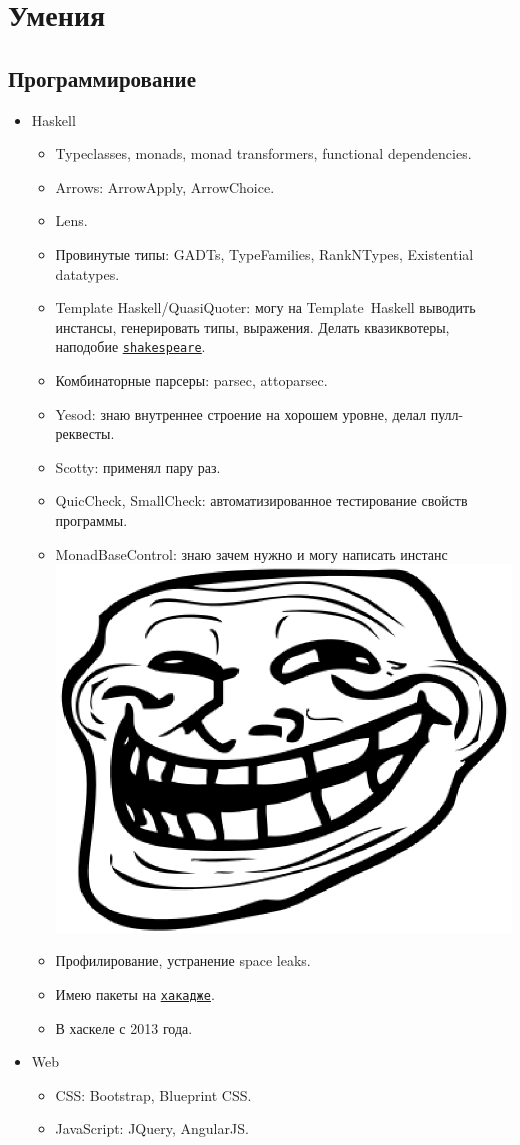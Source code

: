 \documentclass[11pt,a4paper,sans]{moderncv}
\newcommand*{\nlink}[2]{\textcolor{blue}{\texttt{\underline{\href{#1}{#2}}}}}
\begin{document}
\section{Умения}

\subsection{Программирование}

\begin{itemize}
\item Haskell
  \begin{itemize}
  \item Typeclasses, monads, monad transformers, functional dependencies.
  \item Arrows: ArrowApply, ArrowChoice.
  \item Lens.
  \item Провинутые типы: GADTs, TypeFamilies, RankNTypes, Existential datatypes.
  \item Template Haskell/QuasiQuoter: могу на \hbox{Template Haskell}
    выводить инстансы, генерировать типы, выражения. Делать
    квазиквотеры, наподобие
    \nlink{http://hackage.haskell.org/package/shakespeare}{shakespeare}.
  \item Комбинаторные парсеры: parsec, attoparsec.
  \item Yesod: знаю внутреннее строение на хорошем уровне, делал пулл-реквесты.
  \item Scotty: применял пару раз.
  \item QuicCheck, SmallCheck: автоматизированное тестирование свойств
    программы.
  \item MonadBaseControl: знаю зачем нужно и могу написать инстанс
    \includegraphics[height=0.9ex]{Trollface.ps}
  \item Профилирование, устранение space leaks.
  \item Имею пакеты на
    \nlink{http://hackage.haskell.org/user/AlekseyUymanov}{хакадже}.
  \item В хаскеле с 2013 года.
  \end{itemize}
\item Web
  \begin{itemize}
  \item CSS: Bootstrap, Blueprint CSS.
  \item JavaScript: JQuery, AngularJS.
  \end{itemize}

\end{itemize}
\end{document}
